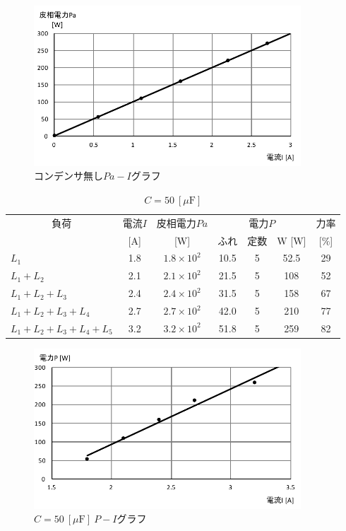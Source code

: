 \documentclass[uplatex]{jsarticle}
\begin{document}
        \begin{figure}[h]
            \centering
            \includegraphics[width = 10cm]{gurahu2.pdf}
            \caption{コンデンサ無し$Pa-I$グラフ}
        \end{figure}
        \begin{table}[h]
            \centering
            \caption{$C = 50 \ [\mu \mathrm F]$}
            \begin{tabular}{l|c|c|c|c|c|c} \hline \hline
                \multicolumn{1}{c|}{負荷}               & 電流$I$ & 皮相電力$Pa$        & \multicolumn{3}{c|}{電力$P$} & 力率 \\ \cline{4-7}
                                                        & [A]     & [W]                 & ふれ & 定数 & W [W]          & [$\%$] \\ \hline
                $L_{1}$                                 & 1.8     & $1.8 \times 10^{2}$ & 10.5 & 5 & 52.5              & 29 \\
                $L_{1} + L_{2}$                         & 2.1     & $2.1 \times 10^{2}$ & 21.5 & 5 & 108               & 52 \\
                $L_{1} + L_{2} + L_{3}$                 & 2.4     & $2.4 \times 10^{2}$ & 31.5 & 5 & 158               & 67 \\
                $L_{1} + L_{2} + L_{3}+ L_{4}$          & 2.7     & $2.7 \times 10^{2}$ & 42.0 & 5 & 210               & 77 \\
                $L_{1} + L_{2} + L_{3} + L_{4} + L_{5}$ & 3.2     & $3.2 \times 10^{2}$ & 51.8 & 5 & 259               & 82 \\ \hline
            \end{tabular}
        \end{table}
        \begin{figure}[h]
            \centering
            \includegraphics[width = 10cm]{gurahu4.pdf}
            \caption{$C = 50 \ [\mu \mathrm F] \ P-I$グラフ}
        \end{figure}
\end{document}
